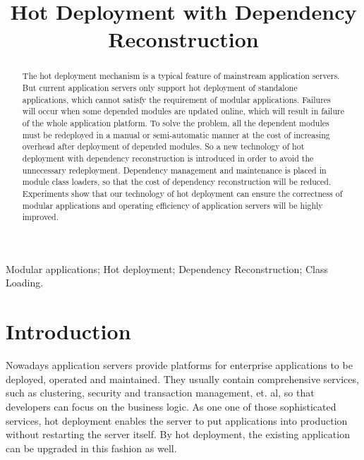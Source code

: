 \documentclass[conference]{IEEEtran}
\begin{document}
\title{Hot Deployment with Dependency Reconstruction}

\author{
}

\maketitle


\begin{abstract}
The hot deployment mechanism is a typical feature of mainstream application servers. 
But current application servers only support hot deployment of standalone applications, which cannot satisfy the requirement of modular applications. 
Failures will occur when some depended modules are updated online, which will result in failure of the whole application platform.
To solve the problem, all the dependent modules must be redeployed in a manual or semi-automatic manner at the cost of increasing overhead after deployment of depended modules.
So a new technology of hot deployment with dependency reconstruction is introduced in order to avoid the unnecessary redeployment.
Dependency management and maintenance is placed in module class loaders, so that the cost of dependency reconstruction will be reduced.
Experiments show that our technology of hot deployment can ensure the correctness of modular applications and operating efficiency of application servers will be highly improved.
\end{abstract}

\begin{IEEEkeywords}
Modular applications; Hot deployment; Dependency Reconstruction; Class Loading.
\end{IEEEkeywords}


\IEEEpeerreviewmaketitle


\section{Introduction\label{sec:introduction}}

Nowadays application servers provide platforms for enterprise applications to be deployed, operated and maintained. They usually contain comprehensive services, such as clustering, security and transaction management, et. al, so that developers can focus on the business logic. As one one of those sophisticated services, hot deployment enables the server to put applications into production without restarting the server itself. By hot deployment, the existing application can be upgraded in this fashion as well.
\end{document}
